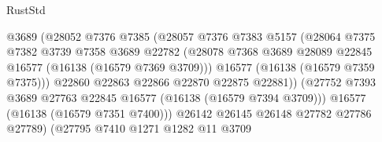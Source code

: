 \begin{lexlean}{RustStd}
\begin{coremodule}
                                        @3689
                                        (@28052
                                          @7376
                                          @7385
                                          (@28057
                                            @7376
                                            @7383
                                            @5157
                                            (@28064
                                              @7375
                                              @7382
                                              @3739
                                              @7358
                                              @3689
                                              @22782
                                              (@28078
                                                @7368
                                                @3689
                                                @28089
                                                @22845
                                                @16577
                                                (@16138 (@16579 @7369 @3709)))
                                              @16577
                                              (@16138 (@16579 @7359 @7375)))
                                            @22860
                                            @22863
                                            @22866
                                            @22870
                                            @22875
                                            @22881))
                                        (@27752
                                          @7393
                                          @3689
                                          @27763
                                          @22845
                                          @16577
                                          (@16138 (@16579 @7394 @3709)))
                                        @16577
                                        (@16138 (@16579 @7351 @7400)))
                                      @26142
                                      @26145
                                      @26148
                                      @27782
                                      @27786
                                      @27789)
                                    (@27795
                                      @7410
                                      @1271
                                      @1282
                                      @11
                                      @3709

\end{coremodule}
\end{lexlean}
